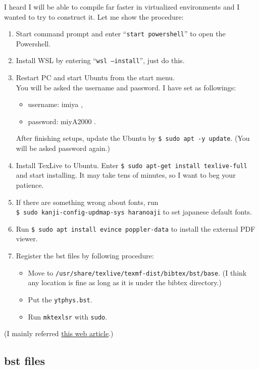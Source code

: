 \documentclass[a4paper,pdftex]{article}
\begin{document}
I heard I will be able to compile far faster in virtualized environments and I wanted to try to construct it. Let me show the procedure:
\begin{enumerate}
  \item 
  Start command prompt and enter ``\texttt{start powershell}'' to open the Powershell.
  \item 
  Install WSL by entering ``\texttt{wsl --install}'', just do this.
  \item 
  Restart PC and start Ubuntu from the start menu.
  \\
  You will be asked the username and password. I have set as followings:
  \begin{itemize}
    \item 
    username: imiya
    ,
    \item 
    password: miyA2000
    .
  \end{itemize}
  After finishing setups, update the Ubuntu by \texttt{\$ sudo apt -y update}. (You will be asked password again.)
  \item 
  Install TexLive to Ubuntu. Enter \texttt{\$ sudo apt-get install texlive-full} and start installing. It may take tens of minutes, so I want to beg your patience.
  \item
  If there are something wrong about fonts, run \\
  \texttt{\$ sudo kanji-config-updmap-sys haranoaji} to set japanese default fonts.
  \item 
  Run \texttt{\$ sudo apt install evince poppler-data} to install the external PDF viewer.
  \item 
  Register the bst files by following procedure:
  \begin{itemize}
    \item 
    Move to \texttt{/usr/share/texlive/texmf-dist/bibtex/bst/base}. (I think any location is fine as long as it is under the bibtex directory.)
    \item 
    Put the \texttt{ytphys.bst}.
    \item 
    Run \texttt{mktexlsr} with \texttt{sudo}.
  \end{itemize}
\end{enumerate}
(I mainly referred \href{https://zenn.dev/minatoneko/articles/b4038eb6524199}{this web article}.)

\subsection{bst files}
\end{document}

